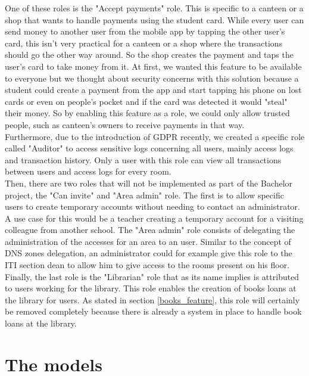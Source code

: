 \documentclass[11pt,a4paper]{report}
\begin{document}
One of these roles is the "Accept payments" role. This is specific to a canteen or a shop that wants to handle payments using the student card. While every user can send money to another user from the mobile app by tapping the other user's card, this isn't very practical for a canteen or a shop where the transactions should go the other way around. So the shop creates the payment and taps the user's card to take money from it. At first, we wanted this feature to be available to everyone but we thought about security concerns with this solution because a student could create a payment from the app and start tapping his phone on lost cards or even on people's pocket and if the card was detected it would "steal" their money. So by enabling this feature as a role, we could only allow trusted people, such as canteen's owners to receive payments in that way. \\

Furthermore, due to the introduction of GDPR recently, we created a specific role called "Auditor" to access sensitive logs concerning all users, mainly access logs and transaction history. Only a user with this role can view all transactions between users and access logs for every room.\\

Then, there are two roles that will not be implemented as part of the Bachelor project, the "Can invite" and "Area admin" role. The first is to allow specific users to create temporary accounts without needing to contact an administrator. A use case for this would be a teacher creating a temporary account for a visiting colleague from another school. The "Area admin" role consists of delegating the administration of the accesses for an area to an user. Similar to the concept of DNS zones delegation, an administrator could for example give this role to the ITI section dean to allow him to give access to the rooms present on his floor.\\

Finally, the last role is the "Librarian" role that as its name implies is attributed to users working for the library. This role enables the creation of books loans at the library for users. As stated in section \ref{books_feature}, this role will certainly be removed completely because there is already a system in place to handle book loans at the library.

\section{The models}
\end{document}
